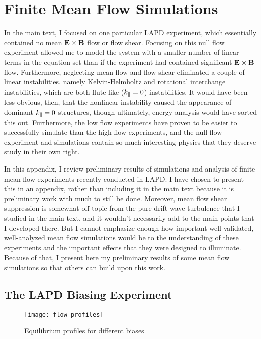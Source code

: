 \chapter{Finite Mean Flow Simulations}
\label{app_mean_flow}

In the main text, I focused on one particular LAPD experiment, which essentially contained no mean ${\bf E \times B}$ flow or flow shear. Focusing on this null flow experiment
allowed me to model the system with a smaller number of linear terms in the equation set than if the experiment had contained significant ${\bf E \times B}$ flow. 
Furthermore, neglecting mean flow and flow shear eliminated a couple of linear instabilities, namely Kelvin-Helmholtz
and rotational interchange instabilities, which are both flute-like ($k_{\parallel} = 0$) instabilities. It would have been less obvious, then, that the nonlinear instability caused the appearance
of dominant $k_{\parallel} = 0$ structures, though ultimately, energy analysis would have sorted this out. Furthermore, the low flow experiments have proven to be easier to successfully simulate than
the high flow experiments, and the null flow experiment and simulations contain so much interesting physics that they deserve study in their own right.

In this appendix, I review preliminary results of simulations and analysis of finite mean flow experiments recently conducted in LAPD. 
I have chosen to present this in an appendix, rather than including it in the main text because
it is preliminary work with much to still be done. Moreover, mean flow shear suppression is somewhat off topic from the pure drift wave turbulence that I studied in the main
text, and it wouldn't necessarily add to the main points that I developed there. But I cannot emphasize enough how important well-validated, well-analyzed mean flow simulations would be
to the understanding of these experiments and the important effects that they were designed to illuminate. Because of that, I present here my preliminary results of some mean flow simulations
so that others can build upon this work.


\section{The LAPD Biasing Experiment}
\label{s_biasing_exp}

\begin{figure}[!ht]
\centerline{\texttt{[image: flow\_profiles]}}
\caption{Equilibrium profiles for different biases}
\label{flow_profiles}
\end{figure}

